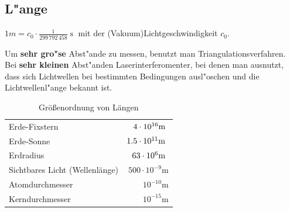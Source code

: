 \subsection{L"ange}

\begin{Def}\label{def_meter}
   $1m = c_0 \cdot \frac{1}{299\, 792\, 458}\operatorname{s}$ mit der
   (Vakuum)Lichtgeschwindigkeit $c_0$.
\end{Def}

Um \textbf{sehr gro"se} Abst"ande zu messen, benutzt man
Triangulationsverfahren. Bei \textbf{sehr kleinen} Abst"anden
Laserinterferomenter, bei denen man ausnutzt, dass sich Lichtwellen
bei bestimmten Bedingungen ausl"oschen und die Lichtwellenl"ange bekannt
ist.

\begin{table}[ht]
\centering
\caption{Größenordnung von Längen}
 \begin{tabular}{l r}
  Erde-Fixstern & $4\cdot 10^{16} \text{m }$\\
  Erde-Sonne & $1.5 \cdot 10^{11} \text{m }$\\
 Erdradius & $63 \cdot 10^6 \text{m } $\\
 Sichtbares Licht (Wellenlänge) & $ 500\cdot 10^{-9}$m \\
 Atomdurchmesser & $10^{-10}$m  \\
 Kerndurchmesser & $10 ^{-15}$m
 \end{tabular}
 \end{table}
 \newpage
